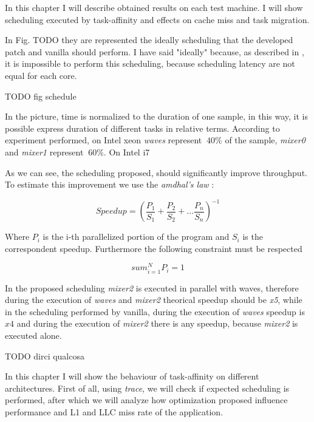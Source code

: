 In this chapter I will describe obtained results on each test machine. I will show scheduling executed by task-affinity and effects on cache miss and 
task migration. 

In Fig. TODO they are represented the ideally scheduling that the developed patch and vanilla should perform. I have said "ideally" because, as described 
in \cite{lcs}, it is impossible to perform this scheduling, because scheduling latency are not equal for each core.
 
TODO fig schedule

In the picture, time is normalized to the duration of one sample, in this way, it is possible express duration of different tasks in relative terms.
According to experiment performed, on Intel xeon \textit{waves} represent $~40\%$ of the sample, \textit{mixer0} and \textit{mixer1} represent $~60\%$.
On Intel i7 

As we can see, the scheduling proposed, should significantly improve throughput. To estimate this improvement we use the \textit{amdhal's law} \cite{lcs}:

\begin{equation}
       Speedup = (\frac{P_{1}}{S_{1}} + \frac{P_{2}}{S_{2}} + ... \frac{P_{n}}{S_{n}})^{-1} 
\label{eq:amdhal}
\end{equation}

Where $P_{i}$ is the i-th parallelized portion of the program and $S_{i}$ is the correspondent speedup. Furthermore the following constraint must be 
respected

\begin{equation}
       sum_{i=1}^N P_{i} = 1
\label{eq:contr_amdhal}
\end{equation}




In the proposed scheduling \textit{mixer2} is executed in parallel with waves, therefore during the execution of \textit{waves} and \textit{mixer2} 
theorical speedup should be \textit{x5}, while in the scheduling performed by vanilla, during the execution of \textit{waves} speedup is $x4$ and during
the execution of  \textit{mixer2} there is any speedup, because \textit{mixer2} is executed alone.

TODO dirci qualcosa


In this chapter I will show the behaviour of task-affinity on different architectures. First of all, using \textit{trace}, we will check if expected 
scheduling is performed, after which we will analyze how optimization proposed influence performance and L1 and LLC miss rate of the application. 

